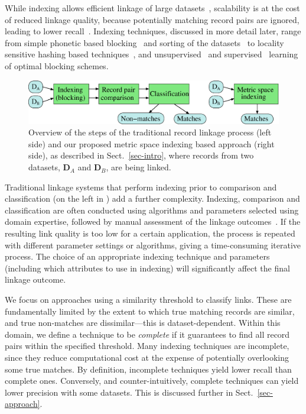 \documentclass{llncs}
\begin{document}
While indexing allows efficient linkage of large
datasets~\cite{Don15}, scalability is at the cost of
reduced linkage quality, because potentially matching record pairs
are ignored, leading to lower
recall~\cite{Chr12}. Indexing techniques, discussed in more
detail later, range from simple
phonetic based blocking~\cite{Chr12} and sorting of the
datasets~\cite{Dra12} to locality sensitive hashing based
techniques~\cite{Kim10,Steorts2014}, and unsupervised~\cite{Kej13,Ram15} and supervised~\cite{Bil06,Mic06}
learning of optimal blocking schemes.



\begin{figure}[!t]
  \centering
  \includegraphics[width=1.0\textwidth]{figures/linkage-process}
  \caption{Overview of the steps of the traditional record linkage
           process (left side) and our proposed metric space
           indexing based approach (right side), as described in
           Sect.~\ref{sec-intro}, where records from two datasets,
           $\mathbf{D}_A$ and $\mathbf{D}_B$, are being linked.}
           \label{fig-rl-process}
\end{figure}


Traditional linkage systems that perform indexing prior to
comparison and classification (on the left in
) add a further complexity. Indexing, comparison and classification are often conducted
using algorithms and parameters selected using
domain expertise, followed
by manual assessment of the linkage
outcomes~\cite{Chr12}. If the resulting link quality is too low for a certain application, the process is
repeated with different parameter settings or algorithms, giving a time-consuming iterative process. The choice of an appropriate indexing
technique and parameters (including which attributes to use in
indexing) will significantly affect the final linkage outcome.

We focus on approaches using a similarity threshold to
classify links. These are fundamentally limited by the extent
to which true matching records are similar, and true non-matches are
dissimilar---this is dataset-dependent. Within this domain, we define
a technique to be \emph{complete} if it guarantees to find all
record pairs within the specified threshold. Many
indexing techniques are incomplete, since they reduce computational
cost at the expense of potentially overlooking some true matches. By
definition, incomplete techniques yield lower recall than complete
ones. Conversely, and counter-intuitively, complete
techniques can yield lower precision with some datasets. This is
discussed further in Sect.~\ref{sec-approach}.
\end{document}
